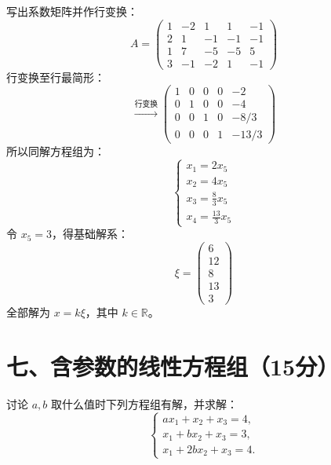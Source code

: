 \documentclass[lang=cn,12pt]{elegantbook}
\begin{document}
\begin{solution}
写出系数矩阵并作行变换：
\[
A = \begin{pmatrix}
1 & -2 & 1 & 1 & -1 \\
2 & 1 & -1 & -1 & -1 \\
1 & 7 & -5 & -5 & 5 \\
3 & -1 & -2 & 1 & -1
\end{pmatrix}
\]
行变换至行最简形：
\[
\xrightarrow{\text{行变换}} 
\begin{pmatrix}
1 & 0 & 0 & 0 & -2 \\
0 & 1 & 0 & 0 & -4 \\
0 & 0 & 1 & 0 & -8/3 \\
0 & 0 & 0 & 1 & -13/3
\end{pmatrix}
\]
所以同解方程组为：
\[
\begin{cases}
x_1 = 2x_5 \\
x_2 = 4x_5 \\
x_3 = \frac{8}{3}x_5 \\
x_4 = \frac{13}{3}x_5
\end{cases}
\]
令 $x_5 = 3$，得基础解系：
\[
\xi = \begin{pmatrix} 6 \\ 12 \\ 8 \\ 13 \\ 3 \end{pmatrix}
\]
全部解为 $x = k\xi$，其中 $k \in \mathbb{R}$。
\end{solution}

\section*{七、含参数的线性方程组（15分）}

\begin{example}
讨论 $a, b$ 取什么值时下列方程组有解，并求解：
\[
\begin{cases} 
ax_1 + x_2 + x_3 = 4, \\ 
x_1 + bx_2 + x_3 = 3, \\ 
x_1 + 2bx_2 + x_3 = 4. 
\end{cases}
\]
\end{example}
\end{document}

